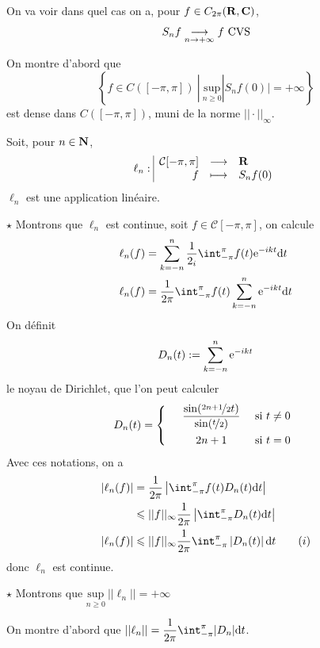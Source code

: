 \documentclass[a4paper,11pt, twoside]{article}
\begin{document}
On va voir dans quel cas on a, pour $f\in C_{2\pi}(\mathbf R,\mathbf C)$,
$$S_nf\underset{n\to+\infty}{\longrightarrow} f\text{ CVS}$$

On montre d'abord que 
$$\left\{f\in C([-\pi,\pi])\ |\ \underset{n\geqslant 0}{\mathrm{sup}}|S_nf(0)|=+\infty\right\}$$
est dense dans $C([-\pi,\pi])$, muni de la norme $||\cdot||_{\infty}$.

\begin{Proof}
  Soit, pour $n\in \mathbf N$, 
  $$\ell_n: 
  \begin{array}{|rcl}
    \mathcal C[-\pi,\pi]&\longrightarrow&\mathbf R\\
    f&\longmapsto&S_nf(0)\\
  \end{array}$$
  $\ell_n$ est une application linéaire.

  $\star$ Montrons que $\ell_n$ est continue, soit $f\in\mathcal C[-\pi,\pi]$, on calcule 
  \begin{align*}
    \ell_n(f)&=\sum_{k=-n}^n\frac{1}{2_i}\int_{-\pi}^{\pi}f(t)\ex{-ikt}\dt\\
    \ell_n(f)&=\frac{1}{2\pi}\int_{-\pi}^{\pi}f(t)\sum_{k=-n}^n\ex{-ikt}\dt
  \end{align*}
  On définit 
  $$D_n(t):=\sum_{k=-n}^n\mathrm{e}^{-ikt}$$
  le noyau de Dirichlet, que l'on peut calculer
  $$D_n(t)=\left\{\begin{array}{rcr}
    &\displaystyle\frac{\sin(\nicefrac{2n+1}{2}t)}{\sin(\nicefrac{t}{2})}&\text{ si }t\neq 0\\[1em]
    & 2n+1&\text{ si }t=0  
  \end{array}\right.$$
  Avec ces notations, on a 
  \begin{align*}
    |\ell_n(f)|&=\frac{1}{2\pi}\left|\int_{-\pi}^{\pi}f(t)D_n(t)\dt\right|\\
    &\leqslant ||f||_{\infty}\frac{1}{2\pi}\left|\int_{-\pi}^{\pi}D_n(t)\dt\right|\\
    |\ell_n(f)|&\leqslant ||f||_{\infty}\frac{1}{2\pi}\int_{-\pi}^{\pi}\left|D_n(t)\right|\dt\qquad (i)
  \end{align*}
  donc $\ell_n$ est continue.

  $\star$ Montrons que $\underset{n\geqslant 0}{\mathrm{sup}}\ ||\ell_n||=+\infty$

  On montre d'abord que $||\ell_n||=\dstyle\frac{1}{2\pi}\int_{-\pi}^{\pi}|D_n|\dt$. 
  

\end{Proof}
\end{document}
